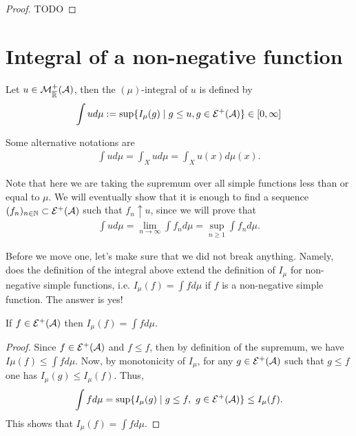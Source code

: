 \begin{proof}
	TODO
\end{proof}

\section{Integral of a non-negative function}

\begin{dfn}
	\label{dfn:mu-integral}
	Let $u \in \mathcal{M}^+_{\overline{\mathbb{R}}}(\mathcal{A})$, then the $(\mu)$-integral of $u$ is defined by
	\begin{align}
		\int u d\mu := \sup \{ I_\mu(g) \mid g \leq u, g \in \mathcal{E}^+(\mathcal{A})\} \in [0, \infty]
	\end{align}
\end{dfn}

Some alternative notations are
\begin{align*}
	\int u d\mu = \int_X u d\mu = \int_X u(x) d\mu(x).
\end{align*}

Note that here we are taking the supremum over all simple functions less than or equal to $\mu$. We will eventually show that it is enough to find a sequence $(f_n)_{n\in\mathbb{N}} \subset \mathcal{E}^+(\mathcal{A})$ such that $f_n \uparrow u$, since we will prove that
\begin{align*}
	\int u d\mu = \lim_{n\to \infty} \int f_n d\mu = \sup_{n \geq 1} \int f_n d\mu.
\end{align*}

Before we move one, let's make sure that we did not break anything. Namely, does the definition of the integral above extend the definition of $I_\mu$ for non-negative simple functions, i.e. $I_\mu(f) = \int f d\mu$ if $f$ is a non-negative simple function. The answer is yes!

\begin{lem}
	\label{lem:def-integral-simple}
	If $f \in \mathcal{E}^+(\mathcal{A})$ then $I_\mu(f) = \int f d\mu$.
\end{lem}

\begin{proof}
	Since $f \in \mathcal{E}^+(\mathcal{A})$ and $f \leq f$, then by definition of the supremum, we have $I\mu(f) \leq \int f d\mu$. Now, by monotonicity of $I_\mu$, for any $g \in \mathcal{E}^+(\mathcal{A})$ such that $g \leq f$ one has $I_\mu(g) \leq I_\mu(f)$. Thus,
	\begin{align*}
		\int f d\mu = \sup \{ I_\mu(g) \mid g \leq f,\ g \in \mathcal{E}^+(\mathcal{A})\} \leq I_\mu(f).
	\end{align*}
	This shows that $I_\mu(f) = \int f d\mu$.
\end{proof}

